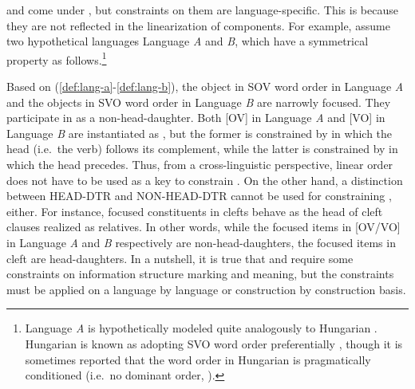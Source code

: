  and  come under , but
constraints on them are language-specific. This is
because they are not reflected in the linearization of components. For
example, assume two hypothetical languages Language \textit{A} and
\textit{B}, which have a symmetrical property as
follows.\footnote{Language \textit{A} is hypothetically modeled quite
  analogously to Hungarian \citep{kiss:98,szendroi:99}. Hungarian is
  known as adopting SVO word order preferentially
  \citep{gell:ruhlen:11}, though it is sometimes reported that the
  word order in Hungarian is pragmatically conditioned (i.e.\ no
  dominant order, \citealt{kiefer:67}).}
 





\noindent Based on (\ref{def:lang-a}-\ref{def:lang-b}), the object in
SOV word order in Language \textit{A} and the objects in SVO word
order in Language \textit{B} are narrowly focused.
They participate in  as a non-head-daughter. Both
[OV] in Language \textit{A} and [VO] in Language \textit{B} are
instantiated as , but the former is constrained
by  in which the head (i.e.\ the verb) follows its
complement, while the latter is constrained by  in
which the head precedes. Thus, from a cross-linguistic perspective,
linear order does not have to be used as a key to constrain
. On the other hand, a distinction
between HEAD-DTR and NON-HEAD-DTR cannot be used for constraining
, either.  For instance, focused constituents in
clefts behave as the head of cleft clauses realized as
relatives. In other words, while the focused items in
[OV/VO] in Language \textit{A} and \textit{B} respectively are
non-head-daughters, the focused items in cleft are head-daughters. In
a nutshell, it is true that  and 
require some constraints on information structure marking and meaning,
but the constraints must be applied on a language by language or
construction by construction basis.


